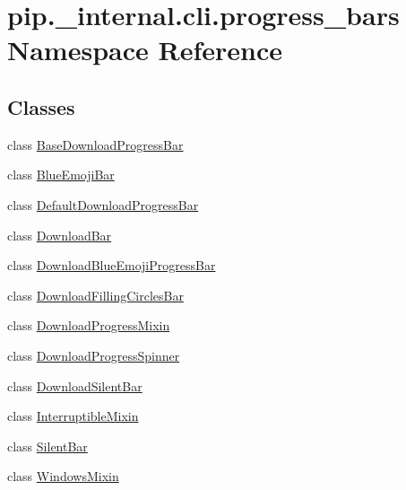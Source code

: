 \hypertarget{namespacepip_1_1__internal_1_1cli_1_1progress__bars}{}\section{pip.\+\_\+internal.\+cli.\+progress\+\_\+bars Namespace Reference}
\label{namespacepip_1_1__internal_1_1cli_1_1progress__bars}
\subsection*{Classes}
\begin{DoxyCompactItemize}
\item 
class \hyperlink{classpip_1_1__internal_1_1cli_1_1progress__bars_1_1BaseDownloadProgressBar}{Base\+Download\+Progress\+Bar}
\item 
class \hyperlink{classpip_1_1__internal_1_1cli_1_1progress__bars_1_1BlueEmojiBar}{Blue\+Emoji\+Bar}
\item 
class \hyperlink{classpip_1_1__internal_1_1cli_1_1progress__bars_1_1DefaultDownloadProgressBar}{Default\+Download\+Progress\+Bar}
\item 
class \hyperlink{classpip_1_1__internal_1_1cli_1_1progress__bars_1_1DownloadBar}{Download\+Bar}
\item 
class \hyperlink{classpip_1_1__internal_1_1cli_1_1progress__bars_1_1DownloadBlueEmojiProgressBar}{Download\+Blue\+Emoji\+Progress\+Bar}
\item 
class \hyperlink{classpip_1_1__internal_1_1cli_1_1progress__bars_1_1DownloadFillingCirclesBar}{Download\+Filling\+Circles\+Bar}
\item 
class \hyperlink{classpip_1_1__internal_1_1cli_1_1progress__bars_1_1DownloadProgressMixin}{Download\+Progress\+Mixin}
\item 
class \hyperlink{classpip_1_1__internal_1_1cli_1_1progress__bars_1_1DownloadProgressSpinner}{Download\+Progress\+Spinner}
\item 
class \hyperlink{classpip_1_1__internal_1_1cli_1_1progress__bars_1_1DownloadSilentBar}{Download\+Silent\+Bar}
\item 
class \hyperlink{classpip_1_1__internal_1_1cli_1_1progress__bars_1_1InterruptibleMixin}{Interruptible\+Mixin}
\item 
class \hyperlink{classpip_1_1__internal_1_1cli_1_1progress__bars_1_1SilentBar}{Silent\+Bar}
\item 
class \hyperlink{classpip_1_1__internal_1_1cli_1_1progress__bars_1_1WindowsMixin}{Windows\+Mixin}
\end{DoxyCompactItemize}
